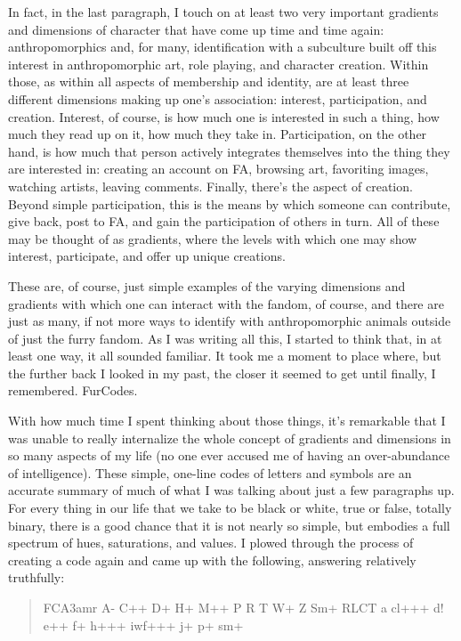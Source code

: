 In fact, in the last paragraph, I touch on at least two very important gradients and dimensions of character that have come up time and time again: anthropomorphics and, for many, identification with a subculture built off this interest in anthropomorphic art, role playing, and character creation.  Within those, as within all aspects of membership and identity, are at least three different dimensions making up one's association: interest, participation, and creation.  Interest, of course, is how much one is interested in such a thing, how much they read up on it, how much they take in.  Participation, on the other hand, is how much that person actively integrates themselves into the thing they are interested in: creating an account on FA, browsing art, favoriting images, watching artists, leaving comments.  Finally, there's the aspect of creation.  Beyond simple participation, this is the means by which someone can contribute, give back, post to FA, and gain the participation of others in turn.  All of these may be thought of as gradients, where the levels with which one may show interest, participate, and offer up unique creations.

These are, of course, just simple examples of the varying dimensions and gradients with which one can interact with the fandom, of course, and there are just as many, if not more ways to identify with anthropomorphic animals outside of just the furry fandom.  As I was writing all this, I started to think that, in at least one way, it all sounded familiar.  It took me a moment to place where, but the further back I looked in my past, the closer it seemed to get until finally, I remembered.  FurCodes.

With how much time I spent thinking about those things, it's remarkable that I was unable to really internalize the whole concept of gradients and dimensions in so many aspects of my life (no one ever accused me of having an over-abundance of intelligence).  These simple, one-line codes of letters and symbols are an accurate summary of much of what I was talking about just a few paragraphs up.  For every thing in our life that we take to be black or white, true or false, totally binary, there is a good chance that it is not nearly so simple, but embodies a full spectrum of hues, saturations, and values.  I plowed through the process of creating a code again and came up with the following, answering relatively truthfully:

\begin{quote}
  FCA3amr A- C++ D+ H+ M++ P R T W+ Z Sm+ RLCT a cl+++ d! e++ f+ h+++ iwf+++ j+ p+ sm+
\end{quote}

